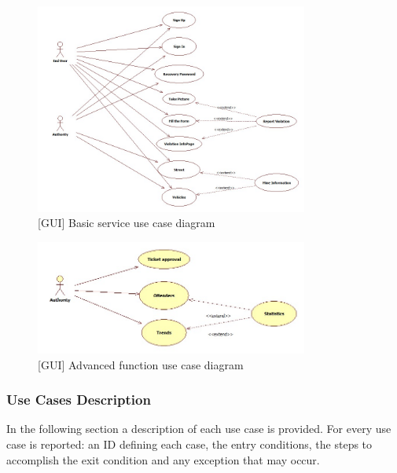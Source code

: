  \begin{figure}[H]
		\centering
      \includegraphics[width=0.8\textwidth]{Images/BasicServiceUseCase.jpg}
      \caption{[GUI] Basic service use case diagram}   \label{fig:BasicService}
\end{figure}

 \begin{figure}[H]
		\centering
      \includegraphics[width=0.8\textwidth]{Images/AdvancedFUnUseCase.jpg}
      \caption{[GUI] Advanced function use case diagram}   \label{fig:AdvancedFunction}
\end{figure}


\subsubsection{Use Cases Description}
In the following section a description of each use case is provided. For every use case is reported: an ID defining each case, the entry conditions, the steps to accomplish the exit condition and any exception that may occur. \\




